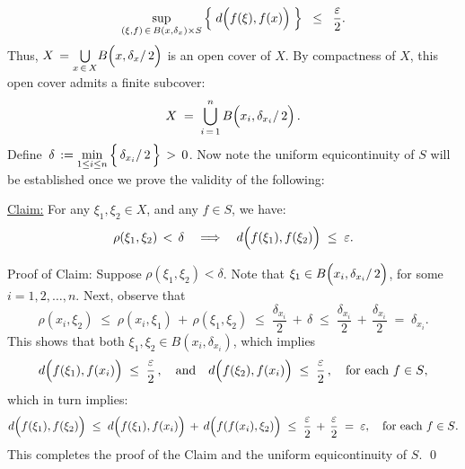 \begin{enumerate}
	\begin{equation*}
	\sup_{(\xi,f) \,\in\, B(x,\delta_{x}) \times S}\left\{\;d\!\left(\overset{{\color{white}.}}{f}(\xi),f(x)\right)\;\right\}
	\;\;\leq\;\;
	\dfrac{\varepsilon}{2}.
	\end{equation*}
	Thus, $X \, = \underset{x\,\in\,X}{\bigcup}B\!\left(x,\delta_{x}\overset{{\color{white}.}}{/}\,2\right)$ is an open cover of $X$.
	By compactness of $X$, this open cover admits a finite subcover:
	\begin{equation*}
	X \; = \; \overset{n}{\underset{i\,=\,1}{\bigcup}}\,B\!\left(x_{i},\delta_{x_{i}}\overset{{\color{white}.}}{/}\,2\right).
	\end{equation*}
	Define \,$\delta \,:= \underset{1\leq i \leq n}{\min}\left\{\,\delta_{x_{i}}\overset{{\color{white}.}}{/}\,2\,\right\} \,>\, 0$.
	Now note the uniform equicontinuity of $S$ will be established once we
	prove the validity of the following:
	\begin{center}
	\begin{minipage}{5.5in}
	\noindent
	\underline{Claim:} \quad For any $\xi_{1}, \xi_{2} \in X$, and any $f \in S$, we have:
	\begin{equation*}
	\rho(\xi_{1},\xi_{2}) \,<\, \delta
	\quad\Longrightarrow\quad
	d\!\left(\overset{{\color{white}.}}{f}(\xi_{1}),f(\xi_{2})\right) \;\leq\; \varepsilon.
	\end{equation*}
	\end{minipage}
	\end{center}
	Proof of Claim: \quad Suppose $\rho(\xi_{1},\xi_{2}) < \delta$.
	Note that $\xi_{1} \in B\!\left(x_{i},\delta_{x_{i}}\overset{{\color{white}.}}{/}\,2\right)$,
	for some $i = 1, 2, \ldots, n$.
	Next, observe that
	\begin{equation*}
	\rho(x_{i},\xi_{2})
	\;\leq\; \rho(x_{i},\xi_{1}) \,+\, \rho(\xi_{1},\xi_{2})
	\;\leq\; \dfrac{\delta_{x_{i}}}{2} \,+\, \delta
	\;\leq\; \dfrac{\delta_{x_{i}}}{2} \,+\, \dfrac{\delta_{x_{i}}}{2}
	\;=\; \delta_{x_{i}}.
	\end{equation*}
	This shows that both $\xi_{1}, \xi_{2} \in B(x_{i},\delta_{x_{i}})$, which implies
	\begin{equation*}
	d\!\left(\overset{{\color{white}.}}{f}(\xi_{1}),f(x_{i})\right) \;\leq\; \dfrac{\varepsilon}{2}\,,
	\quad\textnormal{and}\quad
	d\!\left(\overset{{\color{white}.}}{f}(\xi_{2}),f(x_{i})\right) \;\leq\; \dfrac{\varepsilon}{2}\,,
	\quad\textnormal{for each $f \in S$},
	\end{equation*}
	which in turn implies:
	\begin{equation*}
	d\!\left(\overset{{\color{white}.}}{f}(\xi_{1}),f(\xi_{2})\right)
	\;\leq\; d\!\left(\overset{{\color{white}.}}{f}(\xi_{1}),f(x_{i})\right)
		\,+\, d\!\left(\overset{{\color{white}.}}{f}(f(x_{i}),\xi_{2})\right)
	\;\leq\; \dfrac{\varepsilon}{2} \,+\, \dfrac{\varepsilon}{2}
	\;=\; \varepsilon,
	\quad\textnormal{for each $f \in S$}.
	\end{equation*}
	This completes the proof of the Claim and the uniform equicontinuity of $S$.
	\qed
\end{enumerate}


